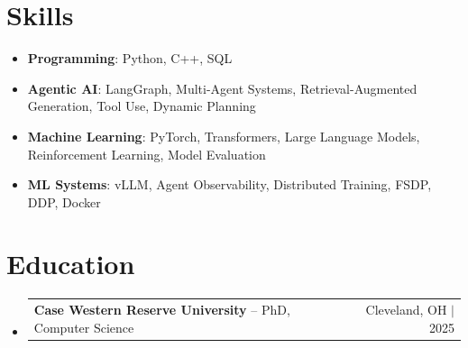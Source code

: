 \documentclass[letterpaper,13pt]{article}
\makeatletter
\newcommand{\resumeProjectHeading}[2]{
    \item
    \begin{tabular*}{\textwidth}{l@{\extracolsep{\fill}}r}
      \small#1 & #2 \\
    \end{tabular*}\vspace{-4pt}
}
\newcommand{\resumeSubHeadingListStart}{\begin{itemize}[leftmargin=0in, label={}]}
\newcommand{\resumeSubHeadingListEnd}{\end{itemize}}
\makeatother
\begin{document}
\section{Skills}
\vspace{0.02cm}
\begin{itemize}[leftmargin=0.15in, label={}, itemsep=2pt, topsep=1pt]
  \item \textbf{Programming}: Python, C++, SQL
  \item \textbf{Agentic AI}: LangGraph, Multi-Agent Systems, Retrieval-Augmented Generation, Tool Use, Dynamic Planning
  \item \textbf{Machine Learning}: PyTorch, Transformers, Large Language Models, Reinforcement Learning, Model Evaluation
  \item \textbf{ML Systems}: vLLM, Agent Observability, Distributed Training, FSDP, DDP, Docker
\end{itemize}
\vspace{0.02cm}

\section{Education}
\resumeSubHeadingListStart
  \resumeProjectHeading{\textbf{Case Western Reserve University} -- PhD, Computer Science}{Cleveland, OH $|$ 2025}
\resumeSubHeadingListEnd
\end{document}
